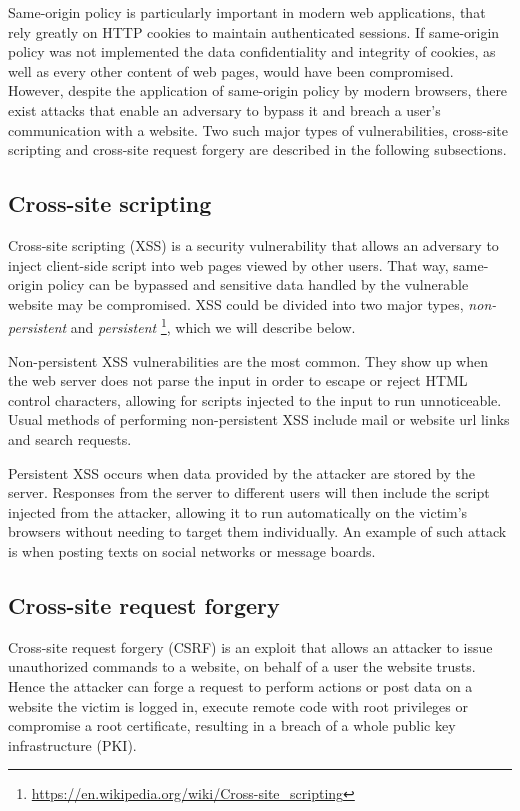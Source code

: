 Same-origin policy is particularly important in modern web applications, that rely greatly on HTTP cookies to maintain authenticated sessions. If same-origin policy was not implemented the data confidentiality and integrity of cookies, as well as every other content of web pages, would have been compromised. However, despite the application of same-origin policy by modern browsers, there exist attacks that enable an adversary to bypass it and breach a user's communication with a website. Two such major types of vulnerabilities, cross-site scripting and cross-site request forgery are described in the following subsections.

\subsection{Cross-site scripting}

Cross-site scripting (XSS) is a security vulnerability that allows an adversary to inject client-side script into web pages viewed by other users. That way, same-origin policy can be bypassed and sensitive data handled by the vulnerable website may be compromised. XSS could be divided into two major types, \textit{non-persistent} and \textit{persistent} \footnote{\url{https://en.wikipedia.org/wiki/Cross-site_scripting}}, which we will describe below.

Non-persistent XSS vulnerabilities are the most common. They show up when the web server does not parse the input in order to escape or reject HTML control characters, allowing for scripts injected to the input to run unnoticeable. Usual methods of performing non-persistent XSS include mail or website url links and search requests.

Persistent XSS occurs when data provided by the attacker are stored by the server. Responses from the server to different users will then include the script injected from the attacker, allowing it to run automatically on the victim's browsers without needing to target them individually. An example of such attack is when posting texts on social networks or message boards.

\subsection{Cross-site request forgery}

Cross-site request forgery (CSRF) is an exploit that allows an attacker to issue unauthorized commands to a website, on behalf of a user the website trusts. Hence the attacker can forge a request to perform actions or post data on a website the victim is logged in, execute remote code with root privileges or compromise a root certificate, resulting in a breach of a whole public key infrastructure (PKI).

